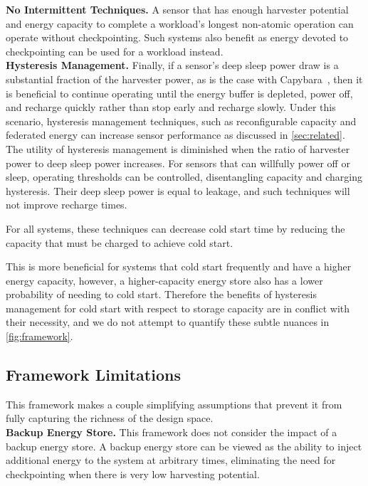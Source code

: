 \vspace{-6pt}
\noindent
\textbf{No Intermittent Techniques.} A sensor that has enough harvester
potential and energy capacity to complete a workload's longest non-atomic
operation can operate without checkpointing. Such systems also benefit as
energy devoted to checkpointing can be used for a workload instead.
\\

\vspace{-6pt}
\noindent
\textbf{Hysteresis Management.}
Finally, if a sensor's deep sleep power draw %
is a substantial fraction of the harvester power, as
is the case with Capybara~\cite{colinReconfigurable18}, then it is
beneficial to continue operating until the energy
buffer is depleted, power off, and recharge quickly
rather than stop early and recharge slowly.
Under this scenario, hysteresis management techniques,
such as reconfigurable capacity and federated energy can increase sensor
performance as discussed in \cref{sec:related}.
The utility of hysteresis management is diminished
when the ratio of harvester power to deep sleep power increases.
For sensors that can willfully power off or sleep,
operating thresholds can be controlled, disentangling
capacity and charging hysteresis.
Their deep
sleep power is equal to leakage, and such techniques
will not improve recharge times.

For all systems, these techniques can decrease cold start time
by reducing the capacity that must be charged
to achieve cold start.

This is more beneficial for systems that cold start frequently and
have a higher energy capacity, however,
a higher-capacity energy store also has a lower probability of
needing to cold start. Therefore the benefits of hysteresis management for
cold start with respect to storage capacity are in conflict with their necessity,
and we do not attempt to quantify these subtle nuances in \cref{fig:framework}.

\subsection{Framework Limitations}
\label{sec:framework:limitations}
This framework makes a couple simplifying assumptions that prevent it from
fully capturing the richness of the design space.\\

\vspace{-6pt}
\noindent
\textbf{Backup Energy Store.}
This framework does not consider the impact of a backup energy store.
A backup energy store can be viewed as the ability to inject additional energy
to the system at arbitrary times,
eliminating the need for checkpointing when there is very low
harvesting potential.

